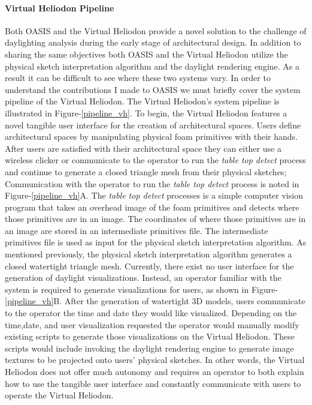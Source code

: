		\paragraph{Virtual Heliodon Pipeline}
			Both OASIS and the Virtual Heliodon provide a novel solution to the challenge of daylighting analysis during the early stage of architectural design.
			In addition to sharing the same objectives both OASIS and the Virtual Heliodon utilize the physical sketch interpretation algorithm and the daylight rendering engine.
			As a result it can be difficult to see where these two systems vary.
			In order to understand the contributions I made to OASIS we must briefly cover the system pipeline of the Virtual Heliodon.
			The Virtual Heliodon's system pipeline is illustrated in Figure-\ref{pipeline_vh}.
			To begin, the Virtual Heliodon features a novel tangible user interface for the creation of architectural spaces.
			Users define architectural spaces by manipulating physical foam primitives with their hands.
			After users are satisfied with their architectural space they can either use a wireless clicker or communicate to the operator to run the \textit{table top detect} process and continue to generate a closed triangle mesh from their physical sketches; Communication with the operator to run the \textit{table top detect} process is noted in Figure-\ref{pipeline_vh}A.
			The \textit{table top detect} processes is a simple computer vision program that takes an overhead image of the foam primitives and detects where those primitives are in an image.
			The coordinates of where those primitives are in an image are stored in an intermediate primitives file. The intermediate primitives file is used as input for the physical sketch interpretation algorithm. As mentioned previously, the physical sketch interpretation algorithm generates a closed watertight triangle mesh.
			Currently, there exist no user interface for the generation of daylight visualizations.
			Instead, an operator familiar with the system is required to generate visualizations for users, as shown in Figure-\ref{pipeline_vh}B.
			After the generation of watertight 3D models, users communicate to the operator the time and date they would like visualized. 
			Depending on the time,date, and user visualization requested the operator would manually modify existing scripts to generate those visualizations on the Virtual Heliodon.
			These scripts would include invoking the daylight rendering engine to generate image textures to be projected onto users' physical sketches.
			In other words, the Virtual Heliodon does not offer much autonomy and requires an operator to both explain how to use the tangible user interface and constantly communicate with users to operate the Virtual Heliodon.

